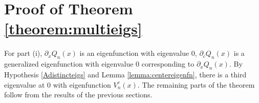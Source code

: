 \documentclass[thesis.tex]{subfiles}
\begin{document}
\section{Proof of Theorem \ref{theorem:multieigs}}

For part (i), $\partial_x Q_n(x)$ is an eigenfunction with eigenvalue 0, $\partial_c Q_n(x)$ is a generalized eigenfunction with eigenvalue 0 corresponding to $\partial_x Q_n(x)$. By Hypothesis \ref{Adistincteigs} and Lemma \ref{lemma:centereigenfn}, there is a third eigenvalue at 0 with eigenfunction $V_n^c(x)$. The remaining parts of the theorem follow from the results of the previous sections.

\iffulldocument\else
	
	
\fi
\end{document}
